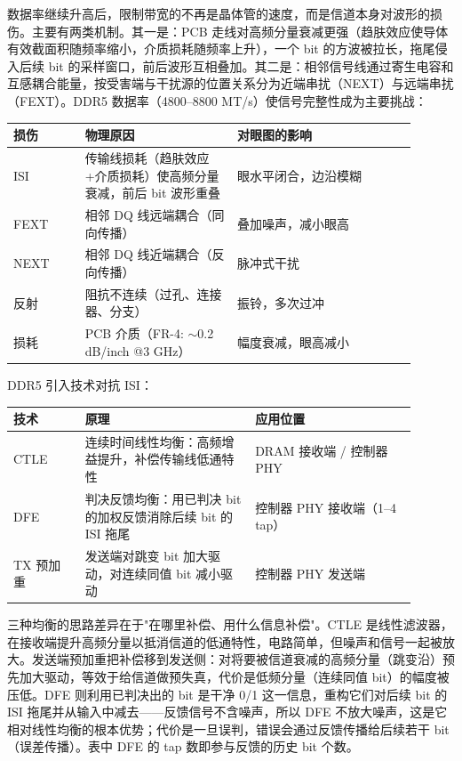 数据率继续升高后，限制带宽的不再是晶体管的速度，而是信道本身对波形的损伤。主要有两类机制。其一是：PCB 走线对高频分量衰减更强（趋肤效应使导体有效截面积随频率缩小，介质损耗随频率上升），一个 bit 的方波被拉长，拖尾侵入后续 bit 的采样窗口，前后波形互相叠加。其二是：相邻信号线通过寄生电容和互感耦合能量，按受害端与干扰源的位置关系分为近端串扰（NEXT）与远端串扰（FEXT）。DDR5 数据率（4800--8800 MT/s）使信号完整性成为主要挑战：

\begin{longtable}{L{0.16\linewidth}L{0.34\linewidth}L{0.4\linewidth}}
\toprule
损伤 & 物理原因 & 对眼图的影响 \\
\midrule
ISI & 传输线损耗（趋肤效应+介质损耗）使高频分量衰减，前后 bit 波形重叠 & 眼水平闭合，边沿模糊 \\
FEXT & 相邻 DQ 线远端耦合（同向传播） & 叠加噪声，减小眼高 \\
NEXT & 相邻 DQ 线近端耦合（反向传播） & 脉冲式干扰 \\
反射 & 阻抗不连续（过孔、连接器、分支） & 振铃，多次过冲 \\
损耗 & PCB 介质（FR-4: $\sim$0.2 dB/inch @3 GHz） & 幅度衰减，眼高减小 \\
\bottomrule
\end{longtable}

DDR5 引入技术对抗 ISI：

\begin{longtable}{L{0.16\linewidth}L{0.38\linewidth}L{0.36\linewidth}}
\toprule
技术 & 原理 & 应用位置 \\
\midrule
CTLE & 连续时间线性均衡：高频增益提升，补偿传输线低通特性 & DRAM 接收端 / 控制器 PHY \\
DFE & 判决反馈均衡：用已判决 bit 的加权反馈消除后续 bit 的 ISI 拖尾 & 控制器 PHY 接收端（1--4 tap） \\
TX 预加重 & 发送端对跳变 bit 加大驱动，对连续同值 bit 减小驱动 & 控制器 PHY 发送端 \\
\bottomrule
\end{longtable}

\begin{classicnote}
三种均衡的思路差异在于"在哪里补偿、用什么信息补偿"。CTLE 是线性滤波器，在接收端提升高频分量以抵消信道的低通特性，电路简单，但噪声和信号一起被放大。发送端预加重把补偿移到发送侧：对将要被信道衰减的高频分量（跳变沿）预先加大驱动，等效于给信道做预失真，代价是低频分量（连续同值 bit）的幅度被压低。DFE 则利用已判决出的 bit 是干净 0/1 这一信息，重构它们对后续 bit 的 ISI 拖尾并从输入中减去——反馈信号不含噪声，所以 DFE 不放大噪声，这是它相对线性均衡的根本优势；代价是一旦误判，错误会通过反馈传播给后续若干 bit（误差传播）。表中 DFE 的 tap 数即参与反馈的历史 bit 个数。
\end{classicnote}

